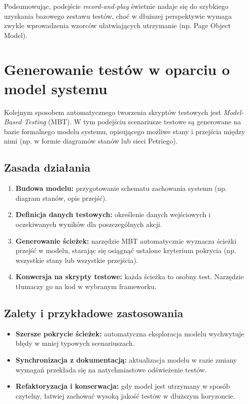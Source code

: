 \documentclass[12pt]{report}
\begin{document}
Podsumowując, podejście \emph{record-and-play} świetnie nadaje się do szybkiego uzyskania bazowego zestawu testów, choć w dłuższej perspektywie wymaga zwykle wprowadzenia wzorców ułatwiających utrzymanie (np. Page Object Model).

\section{Generowanie testów w oparciu o model systemu}
\label{sec:generowanie-model}
Kolejnym sposobem automatycznego tworzenia skryptów testowych jest \emph{Model-Based Testing} (MBT). W tym podejściu scenariusze testowe są generowane na bazie formalnego modelu systemu, opisującego możliwe stany i przejścia między nimi (np. w formie diagramów stanów lub sieci Petriego).

\subsection*{Zasada działania}
\begin{enumerate}
    \item \textbf{Budowa modelu:} przygotowanie schematu zachowania systemu (np. diagram stanów, opis przejść).
    \item \textbf{Definicja danych testowych:} określenie danych wejściowych i oczekiwanych wyników dla poszczególnych akcji.
    \item \textbf{Generowanie ścieżek:} narzędzie MBT automatycznie wyznacza ścieżki przejść w modelu, starając się osiągnąć ustalone kryterium pokrycia (np. wszystkie stany lub wszystkie przejścia).
    \item \textbf{Konwersja na skrypty testowe:} każda ścieżka to osobny test. Narzędzie tłumaczy go na kod w wybranym frameworku.
\end{enumerate}

\subsection*{Zalety i przykładowe zastosowania}
\begin{itemize}
    \item \textbf{Szersze pokrycie ścieżek:} automatyczna eksploracja modelu wychwytuje błędy w mniej typowych scenariuszach.
    \item \textbf{Synchronizacja z dokumentacją:} aktualizacja modelu w razie zmiany wymagań przekłada się na natychmiastowe odświeżenie testów.
    \item \textbf{Refaktoryzacja i konserwacja:} gdy model jest utrzymany w sposób czytelny, łatwiej zachować wysoką jakość testów w dłuższym horyzoncie.
\end{itemize}
\end{document}

